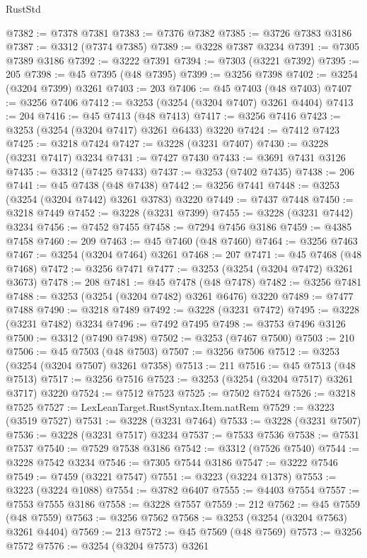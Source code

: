 \begin{lexlean}{RustStd}
\begin{coremodule}
@7382 := @7378 @7381
@7383 := @7376 @7382
@7385 := @3726 @7383 @3186
@7387 := @3312 (@7374 @7385)
@7389 := @3228 @7387 @3234
@7391 := @7305 @7389 @3186
@7392 := @3222 @7391
@7394 := @7303 (@3221 @7392)
@7395 := 205
@7398 := @45 @7395 (@48 @7395)
@7399 := @3256 @7398
@7402 := @3254 (@3204 @7399) @3261
@7403 := 203
@7406 := @45 @7403 (@48 @7403)
@7407 := @3256 @7406
@7412 := @3253 (@3254 (@3204 @7407) @3261 @4404)
@7413 := 204
@7416 := @45 @7413 (@48 @7413)
@7417 := @3256 @7416
@7423 := @3253 (@3254 (@3204 @7417) @3261 @6433) @3220
@7424 := @7412 @7423
@7425 := @3218 @7424
@7427 := @3228 (@3231 @7407)
@7430 := @3228 (@3231 @7417) @3234
@7431 := @7427 @7430
@7433 := @3691 @7431 @3126
@7435 := @3312 (@7425 @7433)
@7437 := @3253 (@7402 @7435)
@7438 := 206
@7441 := @45 @7438 (@48 @7438)
@7442 := @3256 @7441
@7448 := @3253 (@3254 (@3204 @7442) @3261 @3783) @3220
@7449 := @7437 @7448
@7450 := @3218 @7449
@7452 := @3228 (@3231 @7399)
@7455 := @3228 (@3231 @7442) @3234
@7456 := @7452 @7455
@7458 := @7294 @7456 @3186
@7459 := @4385 @7458
@7460 := 209
@7463 := @45 @7460 (@48 @7460)
@7464 := @3256 @7463
@7467 := @3254 (@3204 @7464) @3261
@7468 := 207
@7471 := @45 @7468 (@48 @7468)
@7472 := @3256 @7471
@7477 := @3253 (@3254 (@3204 @7472) @3261 @3673)
@7478 := 208
@7481 := @45 @7478 (@48 @7478)
@7482 := @3256 @7481
@7488 := @3253 (@3254 (@3204 @7482) @3261 @6476) @3220
@7489 := @7477 @7488
@7490 := @3218 @7489
@7492 := @3228 (@3231 @7472)
@7495 := @3228 (@3231 @7482) @3234
@7496 := @7492 @7495
@7498 := @3753 @7496 @3126
@7500 := @3312 (@7490 @7498)
@7502 := @3253 (@7467 @7500)
@7503 := 210
@7506 := @45 @7503 (@48 @7503)
@7507 := @3256 @7506
@7512 := @3253 (@3254 (@3204 @7507) @3261 @7358)
@7513 := 211
@7516 := @45 @7513 (@48 @7513)
@7517 := @3256 @7516
@7523 := @3253 (@3254 (@3204 @7517) @3261 @3717) @3220
@7524 := @7512 @7523
@7525 := @7502 @7524
@7526 := @3218 @7525
@7527 := LexLeanTarget.RustSyntax.Item.natRem
@7529 := @3223 (@3519 @7527)
@7531 := @3228 (@3231 @7464)
@7533 := @3228 (@3231 @7507)
@7536 := @3228 (@3231 @7517) @3234
@7537 := @7533 @7536
@7538 := @7531 @7537
@7540 := @7529 @7538 @3186
@7542 := @3312 (@7526 @7540)
@7544 := @3228 @7542 @3234
@7546 := @7305 @7544 @3186
@7547 := @3222 @7546
@7549 := @7459 (@3221 @7547)
@7551 := @3223 (@3224 @1378)
@7553 := @3223 (@3224 @1088)
@7554 := @3782 @6407
@7555 := @4403 @7554
@7557 := @7553 @7555 @3186
@7558 := @3228 @7557
@7559 := 212
@7562 := @45 @7559 (@48 @7559)
@7563 := @3256 @7562
@7568 := @3253 (@3254 (@3204 @7563) @3261 @4404)
@7569 := 213
@7572 := @45 @7569 (@48 @7569)
@7573 := @3256 @7572
@7576 := @3254 (@3204 @7573) @3261

\end{coremodule}
\end{lexlean}
